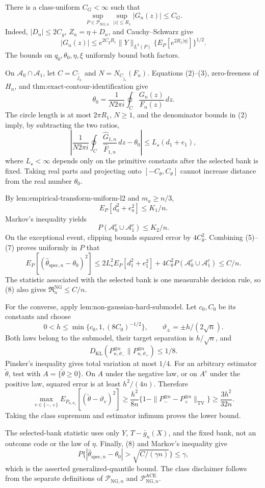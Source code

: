 There is a class-uniform \(C_G<\infty\) such that
\[
 \sup_{P\in\mathcal P_{\mathrm{NG},n}}\sup_{|z|\le R_1}|G_n(z)|\le C_G. \tag{4}
\]
Indeed, \(|D_n|\le2C_g\), \(Z_n=\eta+D_n\), and Cauchy--Schwarz give
\[
 |G_n(z)|\le e^{2C_gR_1}\|Y\|_{L^2(P)}
 \{E_P[e^{2R_1|\eta|}]\}^{1/2}.
\]
The bounds on \(q_0,\theta_0,\eta,\xi\) uniformly bound both factors.

On \(\mathcal A_0\cap\mathcal A_1\), let \(C=C_{\widehat j_n}\) and \(N=N_{C_{\widehat j_n}}(F_n)\).  Equations (2)--(3), zero-freeness of \(H_n\), and \(\text{thm:exact-contour-identification}\) give
\[
 \theta_0=\frac{1}{N2\pi i}\oint_C\frac{G_n(z)}{F_n(z)}\,dz.
\]
The circle length is at most \(2\pi R_1\), \(N\ge1\), and the denominator bounds in (2) imply, by subtracting the two ratios,
\[
 \left|\frac{1}{N2\pi i}\oint_C
 \frac{\widehat G_{1,n}}{\widehat F_{1,n}}\,dz-\theta_0\right|
 \le L_{\star}(d_1+e_1), \tag{5}
\]
where \(L_{\star}<\infty\) depends only on the primitive constants after the selected bank is fixed.  Taking real parts and projecting onto \([-C_{\theta},C_{\theta}]\) cannot increase distance from the real number \(\theta_0\).

By \(\text{lem:empirical-transform-uniform-l2}\) and \(m_a\ge n/3\),
\[
 E_P[d_a^2+e_a^2]\le K_1/n. \tag{6}
\]
Markov's inequality yields
\[
 P(\mathcal A_0^c\cup\mathcal A_1^c)\le K_2/n. \tag{7}
\]
On the exceptional event, clipping bounds squared error by \(4C_{\theta}^2\).  Combining (5)--(7) proves uniformly in \(P\) that
\[
 E_P[(\widehat\theta_{\mathrm{spec},n}-\theta_0)^2]
 \le2L_{\star}^2E_P[d_1^2+e_1^2]
 +4C_{\theta}^2P(\mathcal A_0^c\cup\mathcal A_1^c)
 \le C/n. \tag{8}
\]
The statistic associated with the selected bank is one measurable decision rule, so (8) also gives \(\mathfrak R_n^{\mathrm{NG}}\le C/n\).

For the converse, apply \(\text{lem:non-gaussian-hard-submodel}\).  Let \(c_0,C_0\) be its constants and choose
\[
 0<h\le\min\{c_0,1,(8C_0)^{-1/2}\},
 \qquad \vartheta_{\pm}=\pm h/(2\sqrt n).
\]
Both laws belong to the submodel, their target separation is \(h/\sqrt n\), and
\[
 D_{\mathrm{KL}}(P_{n,\vartheta_-}^{\otimes n}\|P_{n,\vartheta_+}^{\otimes n})\le1/8.
\]
Pinsker's inequality gives total variation at most \(1/4\).  For an arbitrary estimator \(\widetilde\theta\), test with \(A=\{\widetilde\theta\ge0\}\).  On \(A\) under the negative law, or on \(A^c\) under the positive law, squared error is at least \(h^2/(4n)\).  Therefore
\[
 \max_{v\in\{-,+\}}E_{P_{n,\vartheta_v}}[(\widetilde\theta-\vartheta_v)^2]
 \ge \frac{h^2}{8n}\{1-\|P_-^{\otimes n}-P_+^{\otimes n}\|_{\mathrm{TV}}\}
 \ge\frac{3h^2}{32n}.
\]
Taking the class supremum and estimator infimum proves the lower bound.

The selected-bank statistic uses only \(Y\), \(T-\bar g_n(X)\), and the fixed bank, not an outcome code or the law of \(\eta\).  Finally, (8) and Markov's inequality give
\[
 P\{|\widehat\theta_{\mathrm{spec},n}-\theta_0|>\sqrt{C/(\gamma n)}\}\le\gamma,
\]
which is the asserted generalized-quantile bound.  The class disclaimer follows from the separate definitions of \(\mathcal P_{\mathrm{NG},n}\) and \(\mathcal P_{\mathrm{NG},n}^{\mathrm{ACE}}\).